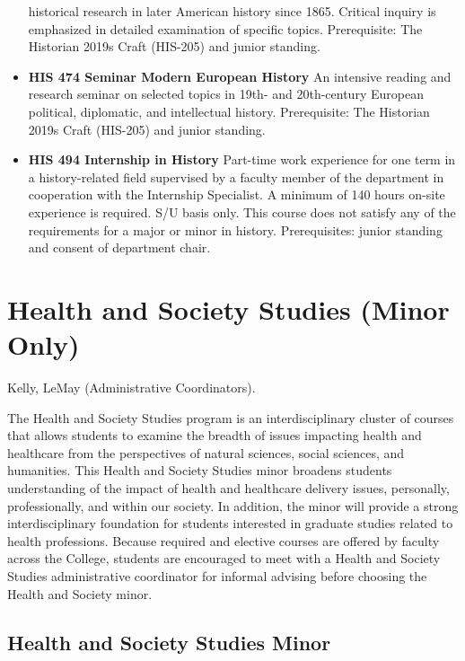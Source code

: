 \documentclass[
  letterpaper,
]{scrbook}
\begin{document}
\begin{itemize}
  historical research in later American history since 1865. Critical
  inquiry is emphasized in detailed examination of specific topics.
  Prerequisite: The Historian 2019s Craft (HIS-205) and junior standing.
\item
  \textbf{HIS 474 Seminar Modern European History} An intensive reading
  and research seminar on selected topics in 19th- and 20th-century
  European political, diplomatic, and intellectual history.
  Prerequisite: The Historian 2019s Craft (HIS-205) and junior standing.
\item
  \textbf{HIS 494 Internship in History} Part-time work experience for
  one term in a history-related field supervised by a faculty member of
  the department in cooperation with the Internship Specialist. A
  minimum of 140 hours on-site experience is required. S/U basis only.
  This course does not satisfy any of the requirements for a major or
  minor in history. Prerequisites: junior standing and consent of
  department chair.
\end{itemize}

\hypertarget{sec-health-and-society-studies}{%
\section{Health and Society Studies (Minor
Only)}\label{sec-health-and-society-studies}}

Kelly, LeMay (Administrative Coordinators).

The Health and Society Studies program is an interdisciplinary cluster
of courses that allows students to examine the breadth of issues
impacting health and healthcare from the perspectives of natural
sciences, social sciences, and humanities. This Health and Society
Studies minor broadens students understanding of the impact of health
and healthcare delivery issues, personally, professionally, and within
our society. In addition, the minor will provide a strong
interdisciplinary foundation for students interested in graduate studies
related to health professions. Because required and elective courses are
offered by faculty across the College, students are encouraged to meet
with a Health and Society Studies administrative coordinator for
informal advising before choosing the Health and Society minor.

\hypertarget{health-and-society-studies-minor}{%
\subsection{Health and Society Studies
Minor}\label{health-and-society-studies-minor}}
\end{document}
